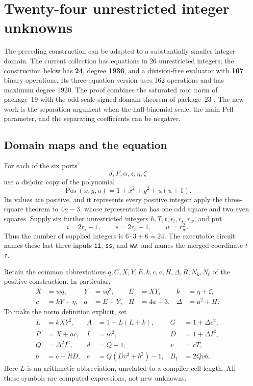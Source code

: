 \documentclass[11pt,letterpaper]{article}
\theoremstyle{remark}
\begin{document}

\section{Twenty-four unrestricted integer unknowns}
\label{sec:integer}

The preceding construction can be adapted to a substantially smaller
integer domain. The current collection has equations in 26 unrestricted
integers; the construction below has \textbf{24}, degree \textbf{1936},
and a division-free evaluator with \textbf{167} binary operations. Its
three-equation version uses 162 operations and has maximum degree 1920.
The proof combines the saturated root norm of package~19 with the odd-scale
signed-domain theorem of package~23 \cite{repo19,repo23,oddscale}.
The new work is the separation argument when the half-binomial scale, the
main Pell parameter, and the separating coefficients can be negative.

\subsection{Domain maps and the equation}

For each of the six ports
\[
 J,F,\alpha,z,\eta,\zeta
\]
use a disjoint copy of the polynomial
\[
 \operatorname{Pos}(x,y,u)=1+x^2+y^2+u(u+1).
\]
Its values are positive, and it represents every positive integer:
apply the three-square theorem to $4n-3$, whose representation has one
odd square and two even squares. Supply six further unrestricted integers
$h,T,t,r_i,r_s,r_w$, and put
\begin{equation}\label{eq:integer-domain}
 i=2r_i+1,\qquad s=2r_s+1,\qquad w=r_w^2.
\end{equation}
Thus the number of supplied integers is $6\cdot3+6=24$.
The executable circuit names these last three inputs \texttt{ii},
\texttt{ss}, and \texttt{ww}, and names the merged coordinate $t$
\texttt{r}.

Retain the common abbreviations $q,C,X,Y,E,k,c,a,H,\Delta,R,N_k,N_t$
of the positive construction. In particular,
\begin{align*}
 X&=wq,&Y&=sq^3,&E&=XY,&k&=\eta+\zeta,\\
 c&=kY+\eta,&a&=E+Y,&H&=4a+3,&\Delta&=a^2+H.
\end{align*}
To make the norm definition explicit, set
\begin{align*}
 L&=kXY^2,& A&=1+L(L+k),&G&=1+\Delta c^2,\\
 P&=X+ac,&I&=ic^2,&D&=1+\Delta I^2,\\
 Q&=\Delta^2I^2,&d&=Q-1,&v&=cT,\\
 b&=c+RD,&e&=Q(Dv^2+b^2)-1,&B_1&=2Qvb.
\end{align*}
Here $L$ is an arithmetic abbreviation, unrelated to a compiler cell
length. All these symbols are computed expressions, not new unknowns.
\end{document}
